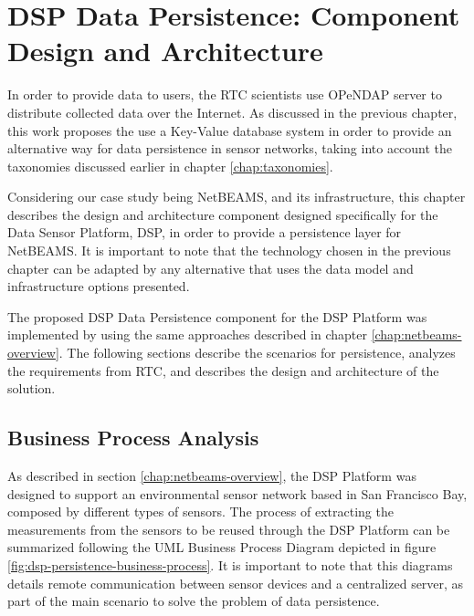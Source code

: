 

\chapter{DSP Data Persistence: Component Design and Architecture}

In order to provide data to users, the RTC scientists use OPeNDAP \cite{opendap}
server to distribute collected data over the Internet. As discussed in the
previous chapter, this work proposes the use a Key-Value database system
in order to provide an alternative way for data persistence in sensor
networks, taking into account the taxonomies discussed earlier in chapter 
\ref{chap:taxonomies}. 

Considering our case study being NetBEAMS, and its infrastructure, this chapter
describes the design and architecture component designed specifically for the
Data Sensor Platform, DSP, in order to provide a persistence layer for
NetBEAMS. It is important to note that the technology chosen in the previous
chapter can be adapted by any alternative that uses the data model and
infrastructure options presented.

The proposed DSP Data Persistence component for the DSP Platform was
implemented by using the same approaches described in chapter
\ref{chap:netbeams-overview}. The following sections describe the scenarios
for persistence, analyzes the requirements from RTC, and describes the design
and architecture of the solution.

\section{Business Process Analysis}
\label{sec:business-process-analysis}
As described in section \ref{chap:netbeams-overview}, the DSP Platform was
designed to support an environmental sensor network based in San Francisco
Bay, composed by different types of sensors. The process of extracting the
measurements from the sensors to be reused through the DSP Platform can be
summarized following the UML Business Process Diagram \cite{uml} depicted in
figure \ref{fig:dsp-persistence-business-process}. It is important to note
that this diagrams details remote communication between sensor devices and a
centralized server, as part of the main scenario to solve the problem of data
persistence.

